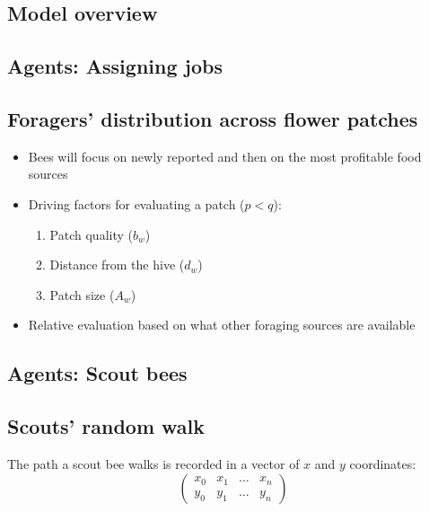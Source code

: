 \documentclass[
	paper=128mm:96mm,
	fontsize=11pt,
	pagesize,
	parskip=half-,
]{scrartcl}
\theoremstyle{mythmstyle} %
\begin{document}
	\clearpage


\subsection{Model overview}
	
	\clearpage


\subsection{Agents: Assigning jobs}
	
	\clearpage


\subsection{Foragers' distribution across flower patches}
	\begin{itemize}
		\item Bees will focus on newly reported and then on the most profitable food sources
		\item Driving factors for evaluating a patch ($p < q$):
		\begin{enumerate}
			\item Patch quality ($b_w$)
			\item Distance from the hive ($d_w$)
			\item Patch size ($A_w$)
		\end{enumerate}
		\item Relative evaluation based on what other foraging sources are available
	\end{itemize}
	\clearpage


\subsection{Agents: Scout bees}
	
	\clearpage



\subsection{Scouts' random walk}
		The path a scout bee walks is recorded in a vector of $x$ and $y$ coordinates:
		\[\begin{pmatrix}
			x_0 & x_1 & \ldots & x_n \\ y_0 & y_1 & \ldots & y_n
		\end{pmatrix}\]
		
\end{document}
